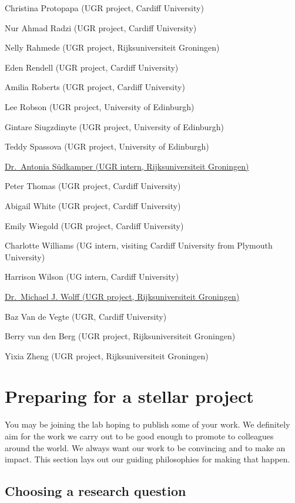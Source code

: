 \documentclass[
  12pt,
]{book}
\begin{document}
Christina Protopapa (UGR project, Cardiff University)

Nur Ahmad Radzi (UGR project, Cardiff University)

Nelly Rahmede (UGR project, Rijksuniversiteit Groningen)

Eden Rendell (UGR project, Cardiff University)

Amilia Roberts (UGR project, Cardiff University)

Lee Robson (UGR project, University of Edinburgh)

Gintare Siugzdinyte (UGR project, University of Edinburgh)

Teddy Spassova (UGR project, University of Edinburgh)

\href{https://www.linkedin.com/in/antoniasudkaemper/}{Dr.~Antonia Südkamper (UGR intern, Rijksuniversiteit Groningen)}

Peter Thomas (UGR project, Cardiff University)

Abigail White (UGR project, Cardiff University)

Emily Wiegold (UGR project, Cardiff University)

Charlotte Williams (UG intern, visiting Cardiff University from Plymouth University)

Harrison Wilson (UG intern, Cardiff University)

\href{https://www.esi-frankfurt.de/people/michaelwolff/}{Dr.~Michael J. Wolff (UGR project, Rijksuniversiteit Groningen)}

Baz Van de Vegte (UGR, Cardiff University)

Berry van den Berg (UGR project, Rijksuniversiteit Groningen)

Yixia Zheng (UGR project, Rijksuniversiteit Groningen)

\chapter{Preparing for a stellar project}\label{intro}

You may be joining the lab hoping to publish some of your work. We definitely aim for the work we carry out to be good enough to promote to colleagues around the world. We always want our work to be convincing and to make an impact. This section lays out our guiding philosophies for making that happen.

\section{Choosing a research question}\label{choosing-a-research-question}
\end{document}
